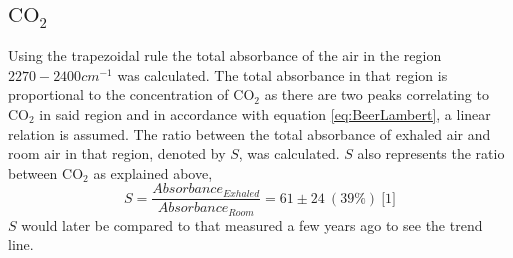 \documentclass[reprint,amsmath,amssymb,aps, prl,superscriptaddress]{revtex4-2}
\begin{document}
\subsection{$\text{CO}_{2}$}
Using the trapezoidal rule
 the total absorbance of the air in the region $2270-2400cm^{-1}$ was calculated.
  The total absorbance in that region is proportional to the concentration of $\text{CO}_{2}$ as there are two peaks correlating to $\text{CO}_{2}$ in said region \cite{NISTwebook} and in accordance with equation \ref{eq:BeerLambert}, a linear relation is assumed.
 The ratio between the total absorbance of exhaled air and room air in that region, denoted by $S$, was calculated. $S$  also represents the ratio between $\text{CO}_{2}$ as explained above,
\begin{equation}
\label{eq:CO2ratio}
S=\frac{Absorbance_{Exhaled}}{Absorbance_{Room}}=61\pm24\ (39\%)\ \text{[1]} %
\end{equation}
$S$
would later be
compared to that measured a few years ago to see the trend line.  
\end{document}
